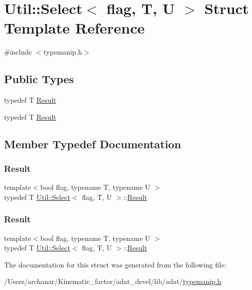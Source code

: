 \hypertarget{structUtil_1_1Select}{}\section{Util\+:\+:Select$<$ flag, T, U $>$ Struct Template Reference}
\label{structUtil_1_1Select}


{\ttfamily \#include $<$typemanip.\+h$>$}

\subsection*{Public Types}
\begin{DoxyCompactItemize}
\item 
typedef T \mbox{\hyperlink{structUtil_1_1Select_a2b5640609685e97b25f3ec1ce967f745}{Result}}
\item 
typedef T \mbox{\hyperlink{structUtil_1_1Select_a2b5640609685e97b25f3ec1ce967f745}{Result}}
\end{DoxyCompactItemize}


\subsection{Member Typedef Documentation}
\mbox{\label{structUtil_1_1Select_a2b5640609685e97b25f3ec1ce967f745}} 
\subsubsection{\texorpdfstring{Result}{Result}\hspace{0.1cm}{\footnotesize\ttfamily [1/2]}}
{\footnotesize\ttfamily template$<$bool flag, typename T, typename U $>$ \\
typedef T \mbox{\hyperlink{structUtil_1_1Select}{Util\+::\+Select}}$<$ flag, T, U $>$\+::\mbox{\hyperlink{structUtil_1_1Select_a2b5640609685e97b25f3ec1ce967f745}{Result}}}

\mbox{\label{structUtil_1_1Select_a2b5640609685e97b25f3ec1ce967f745}} 
\subsubsection{\texorpdfstring{Result}{Result}\hspace{0.1cm}{\footnotesize\ttfamily [2/2]}}
{\footnotesize\ttfamily template$<$bool flag, typename T, typename U $>$ \\
typedef T \mbox{\hyperlink{structUtil_1_1Select}{Util\+::\+Select}}$<$ flag, T, U $>$\+::\mbox{\hyperlink{structUtil_1_1Select_a2b5640609685e97b25f3ec1ce967f745}{Result}}}



The documentation for this struct was generated from the following file\+:\begin{DoxyCompactItemize}
\item 
/\+Users/archanar/\+Kinematic\+\_\+factor/adat\+\_\+devel/lib/adat/\mbox{\hyperlink{lib_2adat_2typemanip_8h}{typemanip.\+h}}\end{DoxyCompactItemize}
